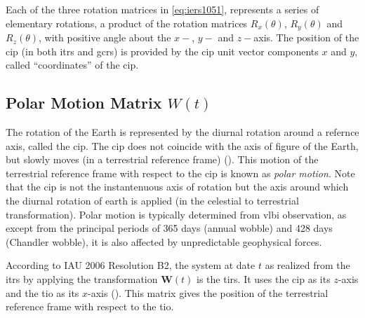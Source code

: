 Each of the three rotation matrices in \ref{eq:iers1051}, represents a series 
of elementary rotations, a product of the rotation matrices $R_x(\theta)$, 
$R_y(\theta)$ and $R_z(\theta)$, with positive angle about the $x-$, $y-$ and 
$z-$axis. The position of the \gls{cip} (in both \gls{itrs} and \gls{gcrs}) is 
provided by the \gls{cip} unit vector components $x$ and $y$, called 
``coordinates'' of the \gls{cip}.

\subsection{Polar Motion Matrix $W(t)$}
\label{ssec:polar-motion-matrix}
The rotation of the Earth is represented by the diurnal rotation around a
refernce axis, called the \gls{cip}. The \gls{cip} does not coincide with 
the axis of figure of the Earth, but slowly moves (in a terrestrial reference 
frame) (\cite{esaa13}). This motion of the terrestrial reference frame 
with respect to the \gls{cip} is known as \emph{polar motion}. Note that the 
\gls{cip} is not the instantenuous axis of rotation but the axis around which the 
diurnal rotation of earth is applied (in the celestial to terrestrial 
transformation). Polar motion is typically determined from \gls{vlbi} 
observation, as except from the principal periods of 365 days (annual wobble) 
and 428 days (Chandler wobble), it is also affected by unpredictable geophysical 
forces.

According to IAU 2006 Resolution B2, the system at date $t$ as realized 
from the \gls{itrs} by applying the transformation $\bm{W}(t)$ is the 
\gls{tirs}. It uses the \gls{cip} as its $z$-axis and the \gls{tio} as 
its $x$-axis (\cite{iers2010}). This matrix gives the position of the 
terrestrial reference frame with respect to the \gls{tio}.

